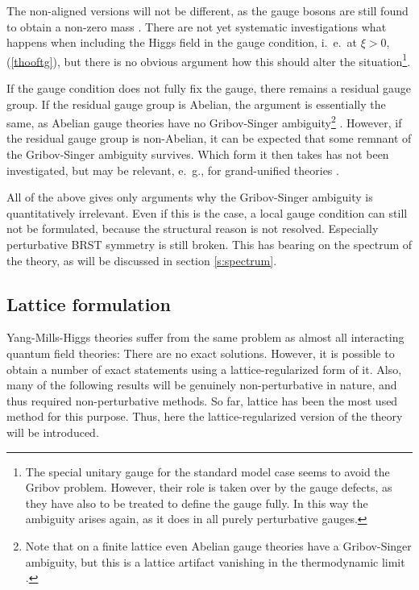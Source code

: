 \documentclass[final,twoside,12pt]{article}
\newcommand*{\pref}[1]{(\ref{#1})}
\newcommand*{\1}{1\!\!\!\bot}
\begin{document}
The non-aligned versions will not be different, as the gauge bosons are still found to obtain a non-zero mass \cite{Maas:2010nc}. There are not yet systematic investigations what happens when including the Higgs field in the gauge condition, i.\ e.\ at $\xi>0$, \pref{thooftg}, but there is no obvious argument how this should alter the situation\footnote{The special unitary gauge for the standard model case \cite{Bohm:2001yx} seems to avoid the Gribov problem. However, their role is taken over by the gauge defects, as they have also to be treated to define the gauge fully. In this way the ambiguity arises again, as it does in all purely perturbative gauges.}.

If the gauge condition does not fully fix the gauge, there remains a residual gauge group. If the residual gauge group is Abelian, the argument is essentially the same, as Abelian gauge theories have no Gribov-Singer ambiguity\footnote{Note that on a finite lattice even Abelian gauge theories have a Gribov-Singer ambiguity, but this is a lattice artifact vanishing in the thermodynamic limit \cite{deForcrand:1994mz,Giusti:2001xf}.} \cite{Lenz:1994tb,Lenz:2000zt}. However, if the residual gauge group is non-Abelian, it can be expected that some remnant of the Gribov-Singer ambiguity survives. Which form it then takes has not been investigated, but may be relevant, e.\ g., for grand-unified theories \cite{Georgi:1974sy,Georgi:1974yf,Langacker:1980js}.

All of the above gives only arguments why the Gribov-Singer ambiguity is quantitatively irrelevant. Even if this is the case, a local gauge condition can still not be formulated, because the structural reason is not resolved. Especially perturbative BRST symmetry is still broken. This has bearing on the spectrum of the theory, as will be discussed in section \ref{s:spectrum}.

\subsection{Lattice formulation}\label{ss:lattice}

Yang-Mills-Higgs theories suffer from the same problem as almost all interacting quantum field theories: There are no exact solutions. However, it is possible to obtain a number of exact statements using a lattice-regularized form of it. Also, many of the following results will be genuinely non-perturbative in nature, and thus required non-perturbative methods. So far, lattice has been the most used method for this purpose. Thus, here the lattice-regularized version of the theory will be introduced.
\end{document}
